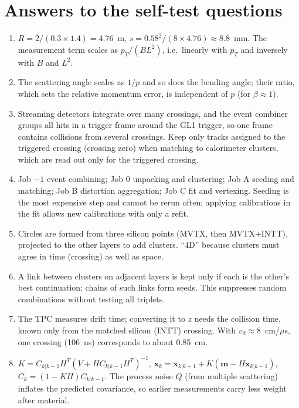 \documentclass[11pt,letterpaper]{article}
\begin{document}
\appendix
\section{Answers to the self-test questions}
\begin{enumerate}[label=A\arabic*.]
\item $R=2/(0.3\times1.4)=4.76$~m, $s=0.58^2/(8\times4.76)\approx8.8$~mm. The measurement term scales as $p_T/(BL^2)$, i.e.\ linearly with $p_T$ and inversely with $B$ and $L^2$.
\item The scattering angle scales as $1/p$ and so does the bending angle; their ratio, which sets the relative momentum error, is independent of $p$ (for $\beta\approx1$).
\item Streaming detectors integrate over many crossings, and the event combiner groups all hits in a trigger frame around the GL1 trigger, so one frame contains collisions from several crossings. Keep only tracks assigned to the triggered crossing (crossing zero) when matching to calorimeter clusters, which are read out only for the triggered crossing.
\item Job $-1$ event combining; Job 0 unpacking and clustering; Job A seeding and matching; Job B distortion aggregation; Job C fit and vertexing. Seeding is the most expensive step and cannot be rerun often; applying calibrations in the fit allows new calibrations with only a refit.
\item Circles are formed from three silicon points (MVTX, then MVTX+INTT), projected to the other layers to add clusters. ``4D'' because clusters must agree in time (crossing) as well as space.
\item A link between clusters on adjacent layers is kept only if each is the other's best continuation; chains of such links form seeds. This suppresses random combinations without testing all triplets.
\item The TPC measures drift time; converting it to $z$ needs the collision time, known only from the matched silicon (INTT) crossing. With $v_d\approx8$~cm/$\mu$s, one crossing (106~ns) corresponds to about 0.85~cm.
\item $K=C_{k|k-1}H^T(V+HC_{k|k-1}H^T)^{-1}$, $\mathbf{x}_k=\mathbf{x}_{k|k-1}+K(\mathbf{m}-H\mathbf{x}_{k|k-1})$, $C_k=(1-KH)C_{k|k-1}$. The process noise $Q$ (from multiple scattering) inflates the predicted covariance, so earlier measurements carry less weight after material.

\end{enumerate}
\end{document}
